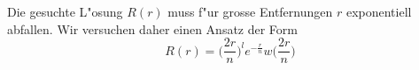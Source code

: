 Die gesuchte L"osung $R(r)$ muss f"ur grosse Entfernungen $r$ exponentiell
abfallen.
Wir versuchen daher einen Ansatz der Form
\[
R(r)=\biggl(\frac{2r}{n}\biggr)^le^{-\frac{r}{n}}w\biggl(\frac{2r}{n}\biggr)
\]

